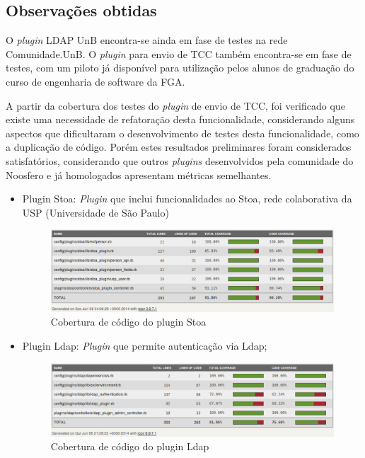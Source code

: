 \begin{enumerate}
\subsection{Observações obtidas}

O \textit{plugin} LDAP UnB encontra-se ainda em fase de testes na rede Comunidade.UnB. 
%
O \textit{plugin} para envio de TCC também encontra-se em fase de testes, com um piloto já disponível para utilização pelos alunos de graduação do curso de engenharia de software da FGA.

A partir da cobertura dos testes do \textit{plugin} de envio de TCC, foi verificado que existe uma necessidade de refatoração desta funcionalidade, considerando alguns aspectos que dificultaram o desenvolvimento de testes desta funcionalidade, como a duplicação de código.
%
Porém estes resultados preliminares foram considerados satisfatórios, considerando que outros \textit{plugins} desenvolvidos pela comunidade do Noosfero e já homologados apresentam métricas semelhantes.

\begin{itemize}
\item Plugin Stoa: \textit{Plugin} que inclui funcionalidades ao Stoa, rede colaborativa da USP (Universidade de São Paulo)

\begin{figure}[!h]
    \centering
    \includegraphics[keepaspectratio=false,scale=0.45]
      {figuras/stoa.eps}
    \caption{Cobertura de código do plugin Stoa}
    \label{consideracoes_cobertura3}
\end{figure}

\item Plugin Ldap: \textit{Plugin} que permite autenticação via Ldap;

\begin{figure}[!h]
    \centering
    \includegraphics[keepaspectratio=false,scale=0.45]
      {figuras/ldap.eps}
    \caption{Cobertura de código do plugin Ldap}
    \label{consideracoes_cobertura4}
\end{figure}


\end{itemize}
\end{enumerate}
